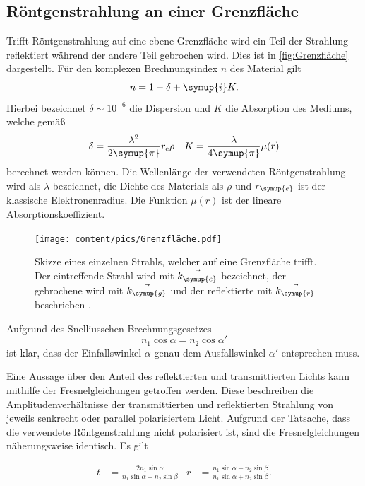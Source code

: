 \subsection{Röntgenstrahlung an einer Grenzfläche}
Trifft Röntgenstrahlung auf eine ebene Grenzfläche wird ein Teil der Strahlung reflektiert während der andere Teil gebrochen wird. Dies ist in \autoref{fig:Grenzfläche}
dargestellt. 
Für den komplexen Brechnungsindex $n$ des Material gilt
\begin{equation*}
    n = 1 - \delta + \symup{i} K.
\end{equation*}
Hierbei bezeichnet $\delta \sim 10^{-6}$ die Dispersion und $K$ die Absorption des Mediums, welche gemäß
\begin{align*}
    \delta &= \frac{\lambda^2}{2\symup{\pi}}r_\text{e} \rho & K = \frac{\lambda}{4\symup{\pi}} \mu (r)
\end{align*}
berechnet werden können. 
Die Wellenlänge der verwendeten Röntgenstrahlung wird als $\lambda$ bezeichnet, die Dichte des Materials als $\rho$ und $r_{\symup{e}}$ ist der klassische Elektronenradius.
Die Funktion $\mu (r)$ ist der lineare Absorptionskoeffizient.
\begin{figure}
    \centering
    \texttt{[image: content/pics/Grenzfläche.pdf]}
    \caption{Skizze eines einzelnen Strahls, welcher auf eine Grenzfläche trifft. Der eintreffende Strahl wird mit $\vec{k_{\symup{e}}}$ bezeichnet, der gebrochene %
    wird mit $\vec{k_{\symup{g}}}$ und der reflektierte mit $\vec{k_{\symup{r}}}$ beschrieben \cite{Demtröder2}.}
    \label{fig:Grenzfläche}
\end{figure}

Aufgrund des Snelliusschen Brechnungsgesetzes
\begin{equation*}
    n_1 \cos \alpha = n_2 \cos \alpha'
\end{equation*}
ist klar, dass der Einfallswinkel $\alpha$ genau dem Ausfallswinkel $\alpha'$ entsprechen muss.

Eine Aussage über den Anteil des reflektierten und transmittierten Lichts kann mithilfe der Fresnelgleichungen getroffen werden. Diese beschreiben die Amplitudenverhältnisse der 
transmittierten und reflektierten Strahlung von jeweils senkrecht oder parallel polarisiertem Licht. Aufgrund der Tatsache, dass die verwendete Röntgenstrahlung nicht polarisiert ist,
sind die Fresnelgleichungen näherungsweise identisch. Es gilt

\begin{align*}
    t &= \frac{2n_1\sin\alpha}{n_1\sin\alpha + n_2 \sin\beta} & r &= \frac{n_1\sin\alpha - n_2\sin\beta}{n_1\sin\alpha+n_2 \sin\beta}.
\end{align*}

